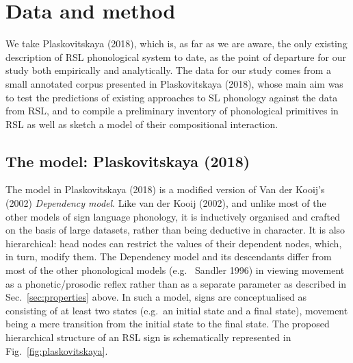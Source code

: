 \hypertarget{sec:data}{%
\section{Data and method}\label{sec:data}}

We take Plaskovitskaya (2018), which is, as far as we are aware, the
only existing description of RSL phonological system to date, as the
point of departure for our study both empirically and analytically. The
data for our study comes from a small annotated corpus presented in
Plaskovitskaya (2018), whose main aim was to test the predictions of
existing approaches to SL phonology against the data from RSL, and to
compile a preliminary inventory of phonological primitives in RSL as
well as sketch a model of their compositional interaction.

\hypertarget{the-model-plaskovitskaya2018}{%
\subsection{The model: Plaskovitskaya
(2018)}\label{the-model-plaskovitskaya2018}}

The model in Plaskovitskaya (2018) is a modified version of Van der
Kooij's (2002) \emph{Dependency model}. Like van der Kooij (2002), and
unlike most of the other models of sign language phonology, it is
inductively organised and crafted on the basis of large datasets, rather
than being deductive in character. It is also hierarchical: head nodes
can restrict the values of their dependent nodes, which, in turn, modify
them. The Dependency model and its descendants differ from most of the
other phonological models (e.g.~ Sandler 1996) in viewing movement as a
phonetic/prosodic reflex rather than as a separate parameter as
described in Sec.~\ref{sec:properties} above. In such a model, signs are
conceptualised as consisting of at least two states (e.g.~an initial
state and a final state), movement being a mere transition from the
initial state to the final state. The proposed hierarchical structure of
an RSL sign is schematically represented in
Fig.~\ref{fig:plaskovitskaya}.


